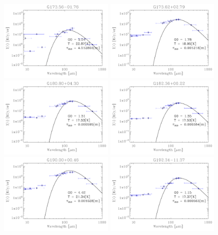\begin{figure}
\includegraphics[trim=-1mm -1mm -1mm -1mm, clip, width=55mm]{appB/appB_42.pdf}
\includegraphics[trim=-1mm -1mm -1mm -1mm, clip, width=55mm]{appB/appB_43.pdf}
\includegraphics[trim=-1mm -1mm -1mm -1mm, clip, width=55mm]{appB/appB_44.pdf}
\includegraphics[trim=-1mm -1mm -1mm -1mm, clip, width=55mm]{appB/appB_45.pdf}
\includegraphics[trim=-1mm -1mm -1mm -1mm, clip, width=55mm]{appB/appB_46.pdf}
\includegraphics[trim=-1mm -1mm -1mm -1mm, clip, width=55mm]{appB/appB_47.pdf}

\end{figure}
